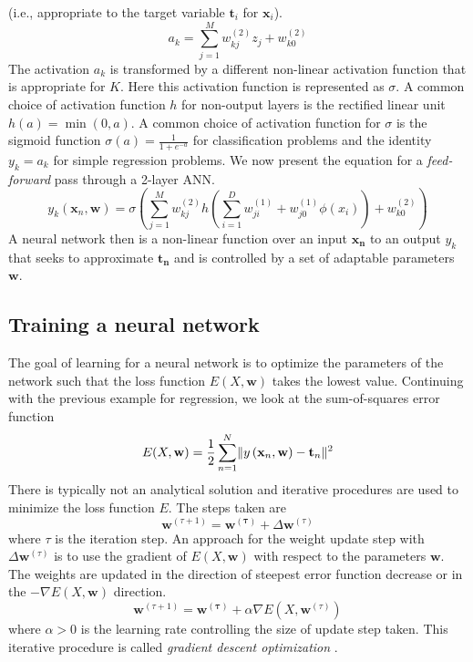 (i.e., appropriate to the target variable $\mathbf{t}_i$ for $\mathbf{x}_i$).
\begin{equation}
     a_k = \sum_{j=1}^{M} w_{kj}^{(2)}z_j + w_{k0}^{(2)} 
\end{equation}
The activation $a_k$ is transformed by a different non-linear activation function that is 
appropriate for $K$. Here this activation function is represented as $\sigma$. A common choice 
of activation function $h$ for non-output layers is the rectified linear unit 
$h(a) = \min(0, a)$. A common choice of activation function for $\sigma$ is the sigmoid 
function $\sigma(a) = \frac{1}{1 + e^{-a}}$ for classification problems and the identity $y_k = a_k$ 
for simple regression problems.
We now present the equation for a \textit{feed-forward} pass through a 2-layer ANN.
\begin{equation}
    y_{k}(\mathbf{x}_n, \mathbf{w}) =  \sigma \left( \sum_{j=1}^{M}  w_{kj}^{(2)}h \left( \sum_{i=1}^{D} w_{ji}^{(1)} + w_{j0}^{(1)} \phi\left(x_i\right)\right) + w_{k0}^{(2)} \right)
\end{equation}
A neural network then is a non-linear function over an input $\mathbf{x_n}$ to an output $y_k$ 
that seeks to approximate $\mathbf{t_n}$ and is controlled by a set of adaptable parameters
$\mathbf{w}$.
\subsection{Training a neural network}
The goal of learning for a neural network is to optimize the parameters of the network such 
that the loss function $E(X, \mathbf{w})$ takes the lowest value. Continuing with the 
previous example for regression, we look at the sum-of-squares error function 
\begin{equation}
    E(X, \mathbf{w}) = \frac{1}{2}\sum_{n=1}^{N} \lVert y\left(\mathbf{x}_n, \mathbf{w}  \right) - \mathbf{t}_n\rVert^2
\end{equation}
There is typically not an analytical solution and iterative procedures are used to 
minimize the loss function $E$. The steps taken are
\begin{equation}
    \mathbf{w}^{(\tau+1)} = \mathbf{w^{(\tau)}} + \Delta \mathbf{w}^{(\tau)}
\end{equation} where $\tau$ is the iteration step. An approach for the weight update step 
with $\Delta \mathbf{w}^{(\tau)}$ is to use the gradient of $E(X, \mathbf{w})$ with 
respect to the parameters $\mathbf{w}$. The weights are updated in the direction of 
steepest error function decrease or in the $- \nabla E(X, \mathbf{w})$ direction.
\begin{equation}
     \mathbf{w}^{(\tau+1)} = \mathbf{w^{(\tau)}} + \alpha \nabla E\left( X, \mathbf{w}^{(\tau)} \right)
\end{equation} where $\alpha > 0$ is the learning rate controlling the size of update step 
taken. This iterative procedure is called \textit{gradient descent optimization} 
\cite{RumHinWil:86}. 

